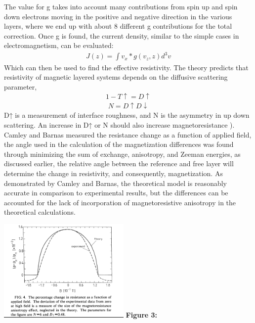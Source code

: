 \documentclass[11pt]{article}
\begin{document}
\begin{multicols}{2}
The value for g takes into account many contributions from spin up and spin down electrons moving in the positive and negative direction in the various layers, where we end up with about 8 different g contributions for the total correction. Once g is found, the current density, similar to  the simple cases in electromagnetism,  can be evaluated:
\begin{align*}
J(z) = \int v_x*g(v_z,z)d^3 v  
\end{align*}
Which can then be used to find the effective resistivity. The theory predicts that resistivity of magnetic layered systems depends on the diffusive scattering parameter, 
\begin{align*}
1-T \uparrow= D \uparrow
\end{align*}
\begin{align*}
N = D \uparrow D \downarrow 
\end{align*}
D↑ is a measurement of interface roughness, and N is the asymmetry in up down scattering. An increase in D↑ or N should also increase magnetoresistance \cite{label2}). Camley and Barnas measured the resistance change as a function of applied field, the angle used in the calculation of the magnetization differences was found through minimizing the sum of exchange, anisotropy, and Zeeman energies, as discussed earlier, the relative angle between the reference and free layer will determine the change in resistivity, and consequently, magnetization. As demonstrated by Camley and Barnas, the theoretical model is reasonably accurate in comparison to experimental results, but the differences can be accounted for the lack of incorporation of magnetoresistive anisotropy in the theoretical calculations. 

\begin{center}
	\centering
	\includegraphics[width=0.48\textwidth]{exp_vs_theory.png}
	{\footnotesize\textbf{Figure 3:}\cite{label6}} 
\end{center} 



\end{multicols}
\end{document}
